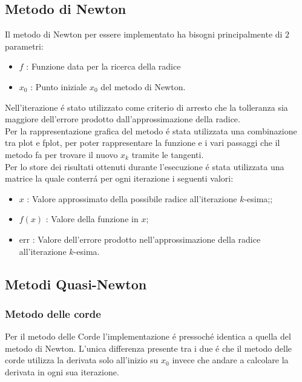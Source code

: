 \documentclass[12pt, letterpaper]{article}
\begin{document}
\subsection{Metodo di Newton}
Il metodo di Newton per essere implementato ha bisogni principalmente di $2$ parametri:
\begin{itemize}
    \item $f$ : Funzione data per la ricerca della radice
    \item $x_0$ : Punto iniziale $x_0$ del metodo di Newton.
\end{itemize}
Nell'iterazione \'e stato utilizzato come criterio di arresto che la tolleranza sia maggiore dell'errore prodotto dall'approssimazione della radice. \\
Per la rappresentazione grafica del metodo \'e stata utilizzata una combinazione tra plot e fplot, per poter rappresentare la funzione e i vari passaggi che il metodo fa per trovare il nuovo $x_k$ tramite le tangenti. \\
Per lo store dei risultati ottenuti durante l'esecuzione \'e stata utilizzata una matrice la quale conterr\'a per ogni iterazione i seguenti valori:
\begin{itemize}
    \item $x$    : Valore approssimato della possibile radice all'iterazione $k$-esima;;
    \item $f(x)$ : Valore della funzione in $x$;
    \item err   : Valore dell'errore prodotto nell'approssimazione della radice all'iterazione $k$-esima.
\end{itemize}

\newpage

\subsection{Metodi Quasi-Newton}
\subsubsection{Metodo delle corde}
Per il metodo delle Corde l'implementazione \'e pressoch\'e identica a quella del metodo di Newton.
L'unica differenza presente tra i due \'e che il metodo delle corde utilizza la derivata solo all'inizio su $x_0$ invece che andare a calcolare la derivata in ogni sua iterazione.
\end{document}
